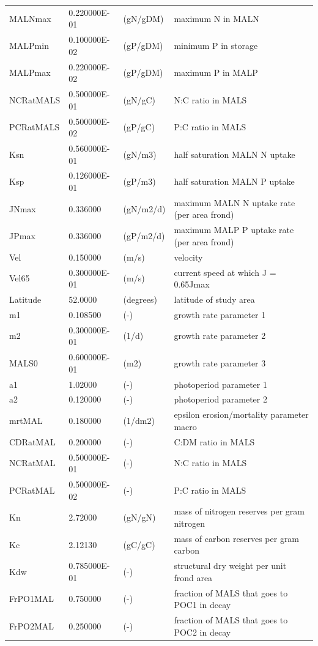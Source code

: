 \documentclass{deltares_manual}
\begin{document}
\begin{longtable}{|l|l|l|l|}
	MALNmax & 0.220000E-01 & (gN/gDM) & maximum N in MALN\\ 
	MALPmin & 0.100000E-02 & (gP/gDM) & minimum P in storage\\ 
	MALPmax & 0.220000E-02 & (gP/gDM) & maximum P in MALP\\ 
	NCRatMALS & 0.500000E-01 & (gN/gC) & N:C ratio in MALS\\ 
	PCRatMALS & 0.500000E-02 & (gP/gC) & P:C ratio in MALS\\ 
	Ksn & 0.560000E-01 & (gN/m3) & half saturation MALN N uptake\\ 
	Ksp & 0.126000E-01 & (gP/m3) & half saturation MALN P uptake\\ 
	JNmax & 0.336000 & (gN/m2/d) & maximum MALN N uptake rate (per area frond)\\ 
	JPmax & 0.336000 & (gP/m2/d) & maximum MALP P uptake rate (per area frond)\\ 
	Vel & 0.150000 & (m/s) & velocity\\ 
	Vel65 & 0.300000E-01 & (m/s) & current speed at which J = 0.65Jmax\\ 
	Latitude & 52.0000 & (degrees) & latitude of study area\\ 
	m1 & 0.108500 & (-) & growth rate parameter 1\\ 
	m2 & 0.300000E-01 & (1/d) & growth rate parameter 2\\ 
	MALS0 & 0.600000E-01 & (m2) & growth rate parameter 3\\ 
	a1 & 1.02000 & (-) & photoperiod parameter 1\\ 
	a2 & 0.120000 & (-) & photoperiod parameter 2\\ 
	mrtMAL & 0.180000 & (1/dm2) & epsilon erosion/mortality parameter macro\\ 
	CDRatMAL & 0.200000 & (-) & C:DM ratio in MALS\\ 
	NCRatMAL & 0.500000E-01 & (-) & N:C ratio in MALS\\ 
	PCRatMAL & 0.500000E-02 & (-) & P:C ratio in MALS\\ 
	Kn & 2.72000 & (gN/gN) & mass of nitrogen reserves per gram nitrogen\\ 
	Kc & 2.12130 & (gC/gC) & mass of carbon reserves per gram carbon\\ 
	Kdw & 0.785000E-01 & (-) & structural dry weight per unit frond area\\ 
	FrPO1MAL & 0.750000 & (-) & fraction of MALS that goes to POC1 in decay\\ 
	FrPO2MAL & 0.250000 & (-) & fraction of MALS that goes to POC2 in decay\\ 

\end{longtable}
\end{document}
